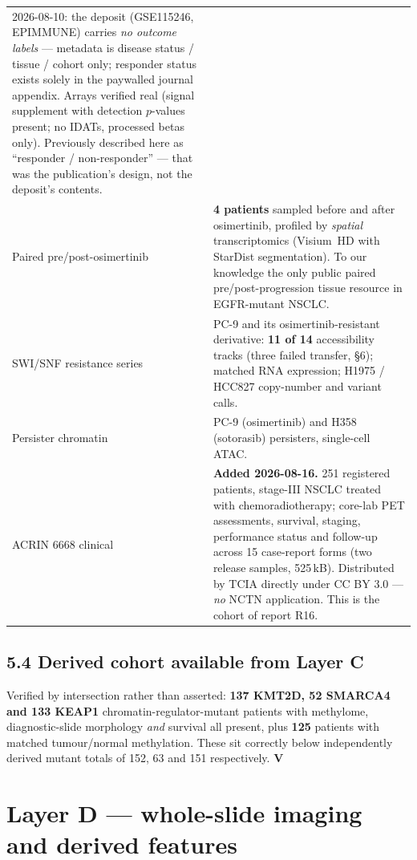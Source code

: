 \documentclass[11pt,a4paper]{article}
\newcommand{\ver}{\textcolor{qgreen}{\textbf{V}}}
\begin{document}
\begin{center}
\begin{tabular}{@{}p{4.0cm}p{10.4cm}@{}}
{{2026-08-10:}} the deposit (GSE115246, EPIMMUNE) carries \emph{no outcome labels} ---
metadata is disease status / tissue / cohort only; responder status exists solely in the
paywalled journal appendix. Arrays verified real (signal supplement with detection
$p$-values present; no IDATs, processed betas only). Previously described here as
``responder / non-responder'' --- that was the publication's design, not the deposit's
contents. \\
Paired pre/post-osimertinib & \textbf{4 patients} sampled before and after osimertinib,
profiled by \emph{spatial} transcriptomics (Visium~HD with StarDist segmentation). To our
knowledge the only public paired pre/post-progression tissue resource in EGFR-mutant
NSCLC. \\
SWI/SNF resistance series & PC-9 and its osimertinib-resistant derivative:
\textbf{11 of 14} accessibility tracks (three failed transfer, \S6); matched RNA
expression; H1975 / HCC827 copy-number and variant calls. \\
Persister chromatin & PC-9 (osimertinib) and H358 (sotorasib) persisters,
single-cell ATAC. \\
ACRIN 6668 clinical & \textbf{Added 2026-08-16.} 251 registered patients, stage-III NSCLC
treated with chemoradiotherapy; core-lab PET assessments, survival, staging, performance
status and follow-up across 15 case-report forms (two release samples, 525\,kB). Distributed
by TCIA directly under CC BY 3.0 --- \emph{no} NCTN application. This is the cohort of
report R16. \\
\bottomrule
\end{tabular}
\end{center}

\subsection*{5.4 Derived cohort available from Layer C}

Verified by intersection rather than asserted: \textbf{137 KMT2D, 52 SMARCA4 and 133
KEAP1} chromatin-regulator-mutant patients with methylome, diagnostic-slide morphology
\emph{and} survival all present, plus \textbf{125} patients with matched tumour/normal
methylation. These sit correctly below independently derived mutant totals of 152, 63 and
151 respectively. \ver

\section{Layer D --- whole-slide imaging and derived features}
\end{document}
